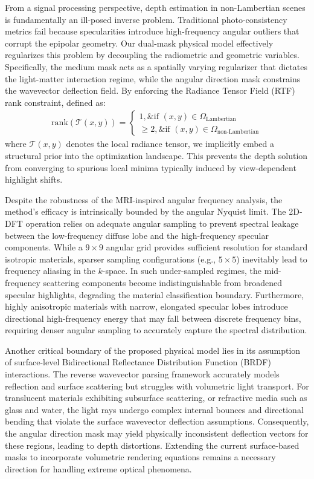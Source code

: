 \documentclass[journal]{IEEEtran}
\begin{document}
From a signal processing perspective, depth estimation in non-Lambertian scenes is fundamentally an ill-posed inverse problem. Traditional photo-consistency metrics fail because specularities introduce high-frequency angular outliers that corrupt the epipolar geometry. Our dual-mask physical model effectively regularizes this problem by decoupling the radiometric and geometric variables. Specifically, the medium mask acts as a spatially varying regularizer that dictates the light-matter interaction regime, while the angular direction mask constrains the wavevector deflection field. By enforcing the Radiance Tensor Field (RTF) rank constraint, defined as:
\begin{align*}
\text{rank}(\mathcal{T}(x, y)) = \begin{cases} 1, \& \text{if } (x, y) \in \Omega_{\text{Lambertian}} \\ \ge 2, \& \text{if } (x, y) \in \Omega_{\text{non-Lambertian}} \end{cases}
\end{align*}
where \(\mathcal{T}(x, y)\) denotes the local radiance tensor, we implicitly embed a structural prior into the optimization landscape. This prevents the depth solution from converging to spurious local minima typically induced by view-dependent highlight shifts.

Despite the robustness of the MRI-inspired angular frequency analysis, the method's efficacy is intrinsically bounded by the angular Nyquist limit. The 2D-DFT operation relies on adequate angular sampling to prevent spectral leakage between the low-frequency diffuse lobe and the high-frequency specular components. While a \(9 \times 9\) angular grid provides sufficient resolution for standard isotropic materials, sparser sampling configurations (e.g., \(5 \times 5\)) inevitably lead to frequency aliasing in the \(k\)-space. In such under-sampled regimes, the mid-frequency scattering components become indistinguishable from broadened specular highlights, degrading the material classification boundary. Furthermore, highly anisotropic materials with narrow, elongated specular lobes introduce directional high-frequency energy that may fall between discrete frequency bins, requiring denser angular sampling to accurately capture the spectral distribution.

Another critical boundary of the proposed physical model lies in its assumption of surface-level Bidirectional Reflectance Distribution Function (BRDF) interactions. The reverse wavevector parsing framework accurately models reflection and surface scattering but struggles with volumetric light transport. For translucent materials exhibiting subsurface scattering, or refractive media such as glass and water, the light rays undergo complex internal bounces and directional bending that violate the surface wavevector deflection assumptions. Consequently, the angular direction mask may yield physically inconsistent deflection vectors for these regions, leading to depth distortions. Extending the current surface-based masks to incorporate volumetric rendering equations remains a necessary direction for handling extreme optical phenomena.
\end{document}
